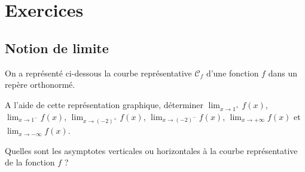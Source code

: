 \documentclass[11pt,fleqn, openany]{book} %
\begin{document}
\chapter{Exercices}

\section*{Notion de limite}

\begin{exercise}On a représenté ci-dessous la courbe représentative $\mathcal{C}_f$ d'une fonction $f$ dans un repère orthonormé.

\begin{minipage}{0.5\linewidth}
\begin{center}
\end{center}
\end{minipage} \hfill \begin{minipage}{0.49\linewidth}
A l'aide de cette représentation graphique, déterminer $\displaystyle \lim_{x \to 1^+} f(x)$, $\displaystyle \lim_{x \to 1^-} f(x)$, $\displaystyle \lim_{x \to (-2)^+} f(x)$, $\displaystyle \lim_{x \to (-2)^-} f(x)$, $\displaystyle \lim_{x \to +\infty} f(x)$ et $\displaystyle \lim_{x \to -\infty} f(x)$.

\vskip10pt

Quelles sont les asymptotes verticales ou horizontales à la courbe représentative de la fonction $f$ ?
\end{minipage}

\end{exercise}
\end{document}
